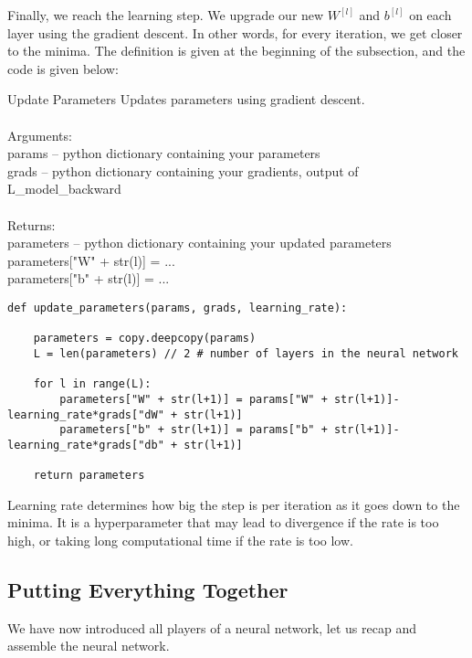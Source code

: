 \documentclass[a4paper]{article}
\begin{document}
\begin{enumerate}
Finally, we reach the learning step. We upgrade our new $W^{[l]}$ and $b^{[l]}$ on each layer using the gradient descent. In other words, for every iteration, we get closer to the minima. The definition is given at the beginning of the subsection, and the code is given below: 

\begin{alg}{Update Parameters}{} Updates parameters using gradient descent. \\~\\
Arguments: \\
params -- python dictionary containing your parameters \\
grads -- python dictionary containing your gradients, output of L\_model\_backward\\~\\
Returns: \\
parameters -- python dictionary containing your updated parameters \\
parameters["W" + str(l)] = ... \\
parameters["b" + str(l)] = ...\\
\begin{verbatim}
def update_parameters(params, grads, learning_rate):

    parameters = copy.deepcopy(params)
    L = len(parameters) // 2 # number of layers in the neural network

    for l in range(L):
        parameters["W" + str(l+1)] = params["W" + str(l+1)]-learning_rate*grads["dW" + str(l+1)]
        parameters["b" + str(l+1)] = params["b" + str(l+1)]-learning_rate*grads["db" + str(l+1)]

    return parameters
\end{verbatim}
\end{alg}

Learning rate determines how big the step is per iteration as it goes down to the minima. It is a hyperparameter that may lead to divergence if the rate is too high, or taking long computational time if the rate is too low. 

\subsection{Putting Everything Together}
We have now introduced all players of a neural network, let us recap and assemble the neural network. \\~\\


\end{enumerate}
\end{document}
